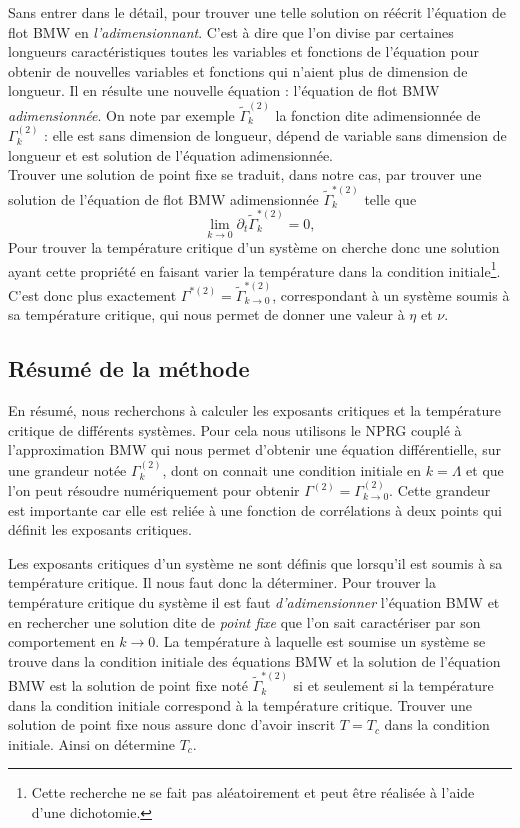 \documentclass[10.5pt]{article}
\begin{document}
\begin{multicols*}{2}
Sans entrer dans le détail, pour trouver une telle solution on réécrit l'équation de flot BMW en \textit{l'adimensionnant}. C'est à dire que l'on divise par certaines longueurs caractéristiques toutes les variables et fonctions de l'équation pour obtenir de nouvelles variables et fonctions qui n'aient plus de dimension de longueur. Il en résulte une nouvelle équation : l'équation de flot BMW \textit{adimensionnée}. On note par exemple $\tilde{\Gamma}_k^{(2)}$ la fonction dite adimensionnée de $\Gamma_k^{(2)}$ : elle est sans dimension de longueur, dépend de variable sans dimension de longueur et est solution de l'équation adimensionnée. \\
\indent
Trouver une solution de point fixe se traduit, dans notre cas, par trouver une solution de l'équation de flot BMW adimensionnée $\tilde{\Gamma}^{*(2)}_k$ telle que
\begin{equation}
\lim\limits_{k \to 0} \partial_t \tilde{\Gamma}^{*(2)}_k = 0,
\label{eq:ptFixe}
\end{equation}
Pour trouver la température critique d'un système on cherche donc une solution ayant cette propriété en faisant varier la température dans la condition initiale\footnote{Cette recherche ne se fait pas aléatoirement et peut être réalisée à l'aide d'une dichotomie.}. C'est donc plus exactement $\Gamma^{*(2)} = \tilde{\Gamma}^{*(2)}_{k \to 0}$, correspondant à un système soumis à sa température critique, qui nous permet de donner une valeur à $\eta$ et $\nu$. \\






\subsection{Résumé de la méthode}

En résumé, nous recherchons à calculer les exposants critiques et la température critique de différents systèmes. Pour cela nous utilisons le NPRG couplé à l'approximation BMW qui nous permet d'obtenir une équation différentielle, sur une grandeur notée $\Gamma^{(2)}_k$, dont on connait une condition initiale en $k = \Lambda$ et que l'on peut résoudre numériquement pour obtenir $\Gamma^{(2)} = \Gamma^{(2)}_{k \to 0}$. Cette grandeur est importante car elle est reliée à une fonction de corrélations à deux points qui définit les exposants critiques.

Les exposants critiques d'un système ne sont définis que lorsqu'il est soumis à sa température critique. Il nous faut donc la déterminer. Pour trouver la température critique du système il est faut \textit{d'adimensionner} l'équation BMW et en rechercher une solution dite de \textit{point fixe} que l'on sait caractériser par son comportement en $k \to 0$. La température à laquelle est soumise un système se trouve dans la condition initiale des équations BMW et la solution de l'équation BMW est la solution de point fixe noté $\tilde{\Gamma}^{* (2)}_k$ si et seulement si la température dans la condition initiale correspond à la température critique. Trouver une solution de point fixe nous assure donc d'avoir inscrit $T=T_c$ dans la condition initiale. Ainsi on détermine $T_c$.


\end{multicols*}
\end{document}
